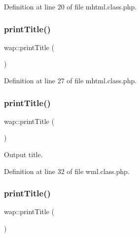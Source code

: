 Definition at line 20 of file mhtml.\+class.\+php.

\hypertarget{classwap_a048fa1324853c9d69e795c7d34f7ad8b}{}\label{classwap_a048fa1324853c9d69e795c7d34f7ad8b} 
\subsubsection{\texorpdfstring{print\+Title()}{printTitle()}\hspace{0.1cm}{\footnotesize\ttfamily [1/3]}}
{\footnotesize\ttfamily wap\+::print\+Title (\begin{DoxyParamCaption}{ }\end{DoxyParamCaption})}



Definition at line 27 of file mhtml.\+class.\+php.

\hypertarget{classwap_a048fa1324853c9d69e795c7d34f7ad8b}{}\label{classwap_a048fa1324853c9d69e795c7d34f7ad8b} 
\subsubsection{\texorpdfstring{print\+Title()}{printTitle()}\hspace{0.1cm}{\footnotesize\ttfamily [2/3]}}
{\footnotesize\ttfamily wap\+::print\+Title (\begin{DoxyParamCaption}{ }\end{DoxyParamCaption})}



Output title. 



Definition at line 32 of file wml.\+class.\+php.

\hypertarget{classwap_a048fa1324853c9d69e795c7d34f7ad8b}{}\label{classwap_a048fa1324853c9d69e795c7d34f7ad8b} 
\subsubsection{\texorpdfstring{print\+Title()}{printTitle()}\hspace{0.1cm}{\footnotesize\ttfamily [3/3]}}
{\footnotesize\ttfamily wap\+::print\+Title (\begin{DoxyParamCaption}{ }\end{DoxyParamCaption})}



